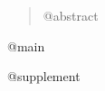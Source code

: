 \documentclass{article}
\begin{document}
\maketitle

\begin{abstract}
    @abstract
\end{abstract}

@main




\renewcommand{\thefigure}{S\arabic{figure}}
\setcounter{figure}{0}

@supplement
\end{document}

